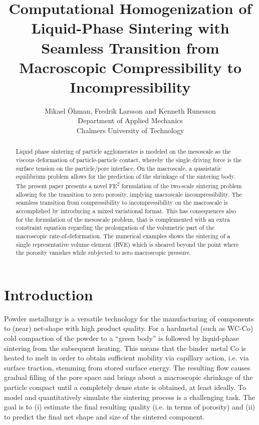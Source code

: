 \documentclass[12pt,a4paper,fleqn]{article}
\begin{document}
\title{Computational Homogenization of Liquid-Phase Sintering with Seamless Transition from Macroscopic Compressibility to Incompressibility}

\author{
Mikael Öhman, Fredrik Larsson and Kenneth Runesson\\
Department of Applied Mechanics \\
Chalmers University of Technology}

\maketitle

\begin{abstract}
\noindent
Liquid phase sintering of particle agglomerates is modeled on the mesoscale as the viscous deformation of particle-particle contact, whereby the single driving force is the surface tension on the particle/pore interface.
On the macroscale, a quasistatic equilibrium problem allows for the prediction of the shrinkage of the sintering body.
The present paper presents a novel FE\textsuperscript{2} formulation of the two-scale sintering problem allowing for the transition to zero porosity, implying macroscale incompressibility.
The seamless transition from compressibility to incompressibility on the macroscale is accomplished by introducing a mixed variational format.
This has consequences also for the formulation of the mesoscale problem, that is complemented with an extra constraint equation regarding the prolongation of the volumetric part of the macroscopic rate-of-deformation.
The numerical examples shows the sintering of a single representative volume element (RVE) which is sheared beyond the point where the porosity vanishes while subjected to zero macroscopic pressure.
\end{abstract}

\section{Introduction}
Powder metallurgy is a versatile technology for the manufacturing of components to (near) net-shape with high product quality. For a hardmetal (such as WC-Co) cold compaction of the powder to a ``green body'' is followed by liquid-phase sintering from the subsequent heating.
This means that the binder metal Co is heated to melt in order to obtain sufficient mobility via capillary action, i.e. via surface traction, stemming from stored surface energy.
The resulting flow causes gradual filling of the pore space and brings about a macroscopic shrinkage of the particle compact until a completely dense state is obtained, at least ideally. To model and quantitatively simulate the sintering process is a challenging task.
The goal is to (i) estimate the final resulting quality (i.e. in terms of porosity) and (ii) to predict the final net shape and size of the sintered component.
\end{document}
